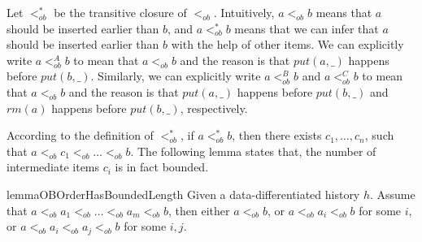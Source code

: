 \documentclass{llncs}
\begin{document}
Let $<_{\textit{ob}}^*$ be the transitive closure of $<_{\textit{ob}}$. Intuitively, $a <_{\textit{ob}} b$ means that $a$ should be inserted earlier than $b$, and $a <_{\textit{ob}}^* b$ means that we can infer that $a$ should be inserted earlier than $b$ with the help of other items. We can explicitly write $a <_{\textit{ob}}^A b$ to mean that $a <_{\textit{ob}} b$ and the reason is that $\textit{put}(a,\_)$ happens before $\textit{put}(b,\_)$. Similarly, we can explicitly write $a <_{\textit{ob}}^B b$ and $a <_{\textit{ob}}^C b$ to mean that $a <_{\textit{ob}} b$ and the reason is that $\textit{put}(a,\_)$ happens before $\textit{put}(b,\_)$ and $\textit{rm}(a)$ happens before $\textit{put}(b,\_)$, respectively.

According to the definition of $<_{\textit{ob}}^*$, if $a <_{\textit{ob}}^* b$, then there exists $c_1,\ldots,c_n$, such that $a <_{\textit{ob}} c_1 <_{\textit{ob}} \ldots <_{\textit{ob}} b$. The following lemma states that, the number of intermediate items $c_i$ is in fact bounded.


\begin{restatable}{lemma}{OBOrderHasBoundedLength}
\label{lemma:ob order has bounded length}
Given a data-differentiated history $h$. Assume that $a <_{\textit{ob}} a_1 <_{\textit{ob}} \ldots <_{\textit{ob}} a_m <_{\textit{ob}} b$, then either $a <_{\textit{ob}} b$, or $a <_{\textit{ob}} a_i <_{\textit{ob}} b$ for some $i$, or $a <_{\textit{ob}} a_i <_{\textit{ob}} a_j <_{\textit{ob}} b$ for some $i,j$.
\end{restatable}
\end{document}
